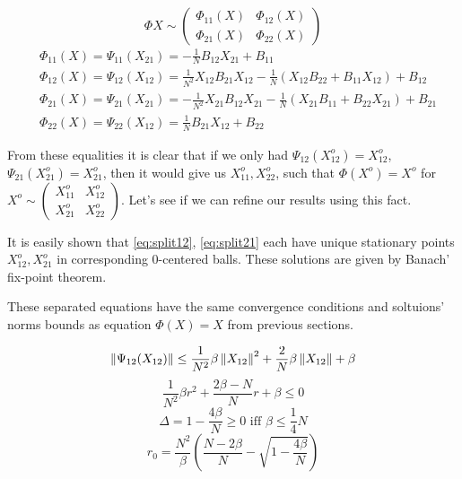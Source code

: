 \documentclass{article}
\begin{document}
\[
    \Phi X \sim
    \begin{pmatrix}
        \Phi_{11}(X) & \Phi_{12}(X) \\
        \Phi_{21}(X) & \Phi_{22}(X)
    \end{pmatrix}
\]
\begin{subequations}
    \begin{align}
        \label{eq:split11}
        & \Phi_{11}(X) = \Psi_{11}(X_{21}) = -\frac1N B_{12}X_{21} + B_{11} \\
        \label{eq:split12}
        & \Phi_{12}(X) = \Psi_{12}(X_{12}) = \frac{1}{N^2} X_{12}B_{21}X_{12} -
                                   \frac1N\left(X_{12}B_{22} +
                                   B_{11}X_{12}\right) + B_{12} \\
        \label{eq:split21}
        & \Phi_{21}(X) = \Psi_{21}(X_{21}) = -\frac{1}{N^2} X_{21}B_{12}X_{21} -
                                   \frac1N\left(X_{21}B_{11} +
                                   B_{22}X_{21}\right) +
                                   B_{21} \\
        \label{eq:split22}
        & \Phi_{22}(X) = \Psi_{22}(X_{12}) = \frac1N B_{21}X_{12} + B_{22}
    \end{align}
\end{subequations}

From these equalities it is clear that if we only had
\( {\Psi_{12}(X_{12}^o) = X_{12}^o} \),
\( {\Psi_{21}(X_{21}^o) = X_{21}^o} \),
then it would give us \( X_{11}^o, X_{22}^o \), such that
\( \Phi(X^o) = X^o \) for
\( X^o \sim
\left(\begin{smallmatrix}
    X_{11}^o & X_{12}^o \\
    X_{21}^o & X_{22}^o
\end{smallmatrix}\right) \).
Let's see if we can refine our results using this fact.

It is easily shown
that \eqref{eq:split12}, \eqref{eq:split21}
each have unique stationary points \( X_{12}^o, X_{21}^o \)
in corresponding \( 0 \)-centered balls.
These solutions are given by Banach' fix-point theorem.

These separated equations have the same convergence conditions
and soltuions' norms bounds as equation \( \Phi(X)=X \) from previous sections.

\[ \left\|{\Psi_{12}(X_{12})}\right\| \leq
    \frac{1}{N^2}\beta\left\|{X_{12}}\right\|^2 + \frac2N \beta\left\|{X_{12}}\right\| + \beta \]
\[ \frac{1}{N^2}\beta r^2 + \frac{2\beta - N}{N} r + \beta \leq 0 \]
\[
    \Delta = 1 - \frac{4\beta}{N} \geq 0
    \text{ iff }
    \beta \leq \frac14 N
\]
\[
    r_0 = \frac{N^2}{\beta}
          \left(
                \frac{N-2\beta}{N} - \sqrt{1 - \frac{4\beta}{N}}
          \right)
    \]
\end{document}
